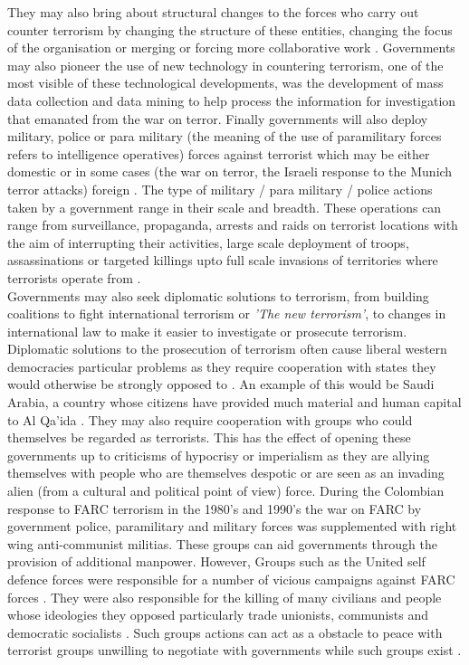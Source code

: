 They may also bring about structural changes to the forces who carry out counter terrorism by changing the structure of these entities, changing the focus of the organisation or merging or forcing more collaborative work \citep{jamwal2003counter}. Governments may also pioneer the use of new technology in countering terrorism, one of the most visible of these technological developments, was the development of mass data collection and data mining to help process the information for investigation that emanated from the war on terror. Finally governments will also deploy military, police or para military (the meaning of the use of paramilitary forces refers to intelligence operatives) forces against terrorist which may be either domestic or in some cases (the war on terror, the Israeli response to the Munich terror attacks) foreign \citep{calahan1995countering}. The type of military / para military / police actions taken by a government range in their scale and breadth. These operations can range from surveillance, propaganda, arrests and raids on terrorist locations with the aim of interrupting their activities, large scale deployment of troops, assassinations or targeted killings upto full scale invasions of territories where terrorists operate from \citep{conetta2002strange}. 
\\
Governments may also seek diplomatic solutions to terrorism, from building coalitions to fight international terrorism or \textit{'The new terrorism'}, to changes in international law to make it easier to investigate or prosecute terrorism. Diplomatic solutions to the prosecution of terrorism often cause liberal western democracies particular problems as they require cooperation with states they would otherwise be strongly opposed to \citep{jarvis2014critical}. An example of this would be Saudi Arabia, a country whose citizens have provided much material and human capital to Al Qa'ida \citep{abuza2003funding}. They may also require cooperation with groups who could themselves be regarded as terrorists. This has the effect of opening these governments up to criticisms of hypocrisy or imperialism as they are allying themselves with people who are themselves despotic or are seen as an invading alien (from a cultural and political point of view) force. During the Colombian response to FARC terrorism in the 1980's and 1990's  the war on FARC by government police, paramilitary and military forces was supplemented with right wing anti-communist militias. These groups can aid governments through the provision of additional manpower. However, Groups such as the United self defence forces were responsible for a number of vicious campaigns against FARC forces \citep{ColombiaRightWingTerror}. They were also responsible for the killing of many civilians and people whose ideologies they opposed particularly trade unionists, communists and democratic socialists \citep{peceny2006farc}. Such groups actions can act as a obstacle to peace with terrorist groups unwilling to negotiate with governments while such groups exist \citep{ColombiaAUCFARC}.
